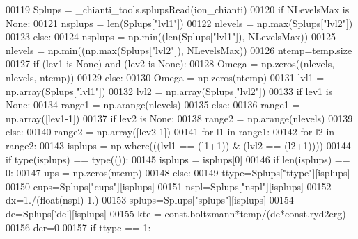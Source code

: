 \begin{DoxyCode}
00119         Splups = \_chianti\_tools.splupsRead(ion\_chianti)
00120     \textcolor{keywordflow}{if} NLevelsMax \textcolor{keywordflow}{is} \textcolor{keywordtype}{None}:
00121         nsplups = len(Splups[\textcolor{stringliteral}{"lvl1"}])
00122         nlevels = np.max(Splups[\textcolor{stringliteral}{"lvl2"}])
00123     \textcolor{keywordflow}{else}:
00124         nsplups = np.min((len(Splups[\textcolor{stringliteral}{"lvl1"}]), NLevelsMax))
00125         nlevels = np.min((np.max(Splups[\textcolor{stringliteral}{"lvl2"}]), NLevelsMax))
00126     ntemp=temp.size
00127     \textcolor{keywordflow}{if} (lev1 \textcolor{keywordflow}{is} \textcolor{keywordtype}{None}) \textcolor{keywordflow}{and} (lev2 \textcolor{keywordflow}{is} \textcolor{keywordtype}{None}):
00128         Omega = np.zeros((nlevels, nlevels, ntemp))
00129     \textcolor{keywordflow}{else}:
00130         Omega = np.zeros(ntemp)
00131     lvl1 = np.array(Splups[\textcolor{stringliteral}{"lvl1"}])
00132     lvl2 = np.array(Splups[\textcolor{stringliteral}{"lvl2"}])
00133     \textcolor{keywordflow}{if} lev1 \textcolor{keywordflow}{is} \textcolor{keywordtype}{None}:
00134         range1 = np.arange(nlevels)
00135     \textcolor{keywordflow}{else}:
00136         range1 = np.array([lev1-1])
00137     \textcolor{keywordflow}{if} lev2 \textcolor{keywordflow}{is} \textcolor{keywordtype}{None}:
00138         range2 = np.arange(nlevels)
00139     \textcolor{keywordflow}{else}:
00140         range2 = np.array([lev2-1])
00141     \textcolor{keywordflow}{for} l1 \textcolor{keywordflow}{in} range1:
00142         \textcolor{keywordflow}{for} l2 \textcolor{keywordflow}{in} range2:
00143             isplups = np.where(((lvl1 == (l1+1)) & (lvl2 == (l2+1))))
00144             \textcolor{keywordflow}{if} type(isplups) == type(()):
00145                 isplups = isplups[0]                
00146             \textcolor{keywordflow}{if} len(isplups) == 0:
00147                 ups = np.zeros(ntemp)
00148             \textcolor{keywordflow}{else}:
00149                 ttype=Splups[\textcolor{stringliteral}{"ttype"}][isplups]
00150                 cups=Splups[\textcolor{stringliteral}{"cups"}][isplups]
00151                 nspl=Splups[\textcolor{stringliteral}{"nspl"}][isplups]
00152                 dx=1./(float(nspl)-1.)
00153                 splups=Splups[\textcolor{stringliteral}{"splups"}][isplups]
00154                 de=Splups[\textcolor{stringliteral}{'de'}][isplups]
00155                 kte = const.boltzmann*temp/(de*const.ryd2erg)
00156                 der=0
00157                 \textcolor{keywordflow}{if} ttype == 1:

\end{DoxyCode}
